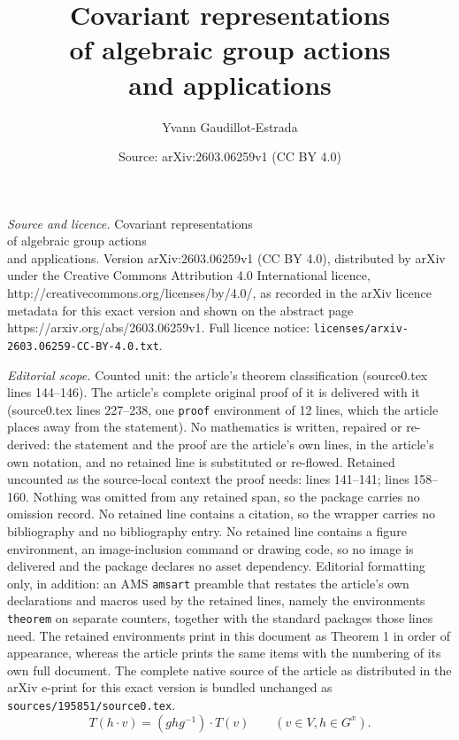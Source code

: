 \documentclass[10pt,a4paper]{amsart}
\title{Covariant representations \\ of algebraic group actions \\ and applications}
\author{Yvann Gaudillot-Estrada}
\date{Source: arXiv:2603.06259v1 (CC BY 4.0)}
\begin{document}
\maketitle

\noindent\emph{Source and licence.} Covariant representations \\ of algebraic group actions \\ and applications. Version arXiv:2603.06259v1 (CC BY 4.0), distributed by arXiv under the Creative Commons Attribution 4.0 International licence, http://creativecommons.org/licenses/by/4.0/, as recorded in the arXiv licence metadata for this exact version and shown on the abstract page https://arxiv.org/abs/2603.06259v1. Full licence notice: \texttt{licenses/arxiv-2603.06259-CC-BY-4.0.txt}.\par\smallskip

\noindent\textit{Editorial scope.} Counted unit: the article's theorem classification (source0.tex lines 144--146). The article's complete original proof of it is delivered with it (source0.tex lines 227--238, one \texttt{proof} environment of 12 lines, which the article places away from the statement). No mathematics is written, repaired or re-derived: the statement and the proof are the article's own lines, in the article's own notation, and no retained line is substituted or re-flowed.  Retained uncounted as the source-local context the proof needs: lines 141--141; lines 158--160.  Nothing was omitted from any retained span, so the package carries no omission record.  No retained line contains a citation, so the wrapper carries no bibliography and no bibliography entry.  No retained line contains a figure environment, an image-inclusion command or drawing code, so no image is delivered and the package declares no asset dependency.  Editorial formatting only, in addition: an AMS \texttt{amsart} preamble that restates the article's own declarations and macros used by the retained lines, namely the environments \texttt{theorem} on separate counters, together with the standard packages those lines need.  The retained environments print in this document as Theorem 1 in order of appearance, whereas the article prints the same items with the numbering of its own full document.  The complete native source of the article as distributed in the arXiv e-print for this exact version is bundled unchanged as \texttt{sources/195851/source0.tex}.
    \begin{equation}\label{twist} T(h\cdot v) = (ghg^{-1})\cdot T(v) \qquad (v \in V, h \in G^{x}).\end{equation}
\end{document}
